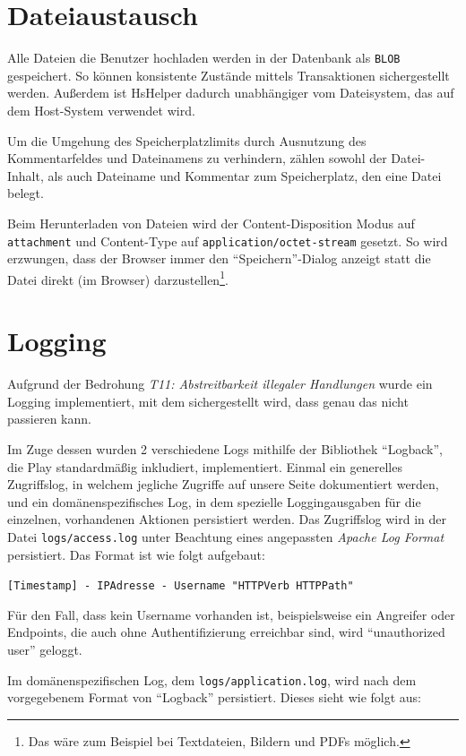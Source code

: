 \documentclass[12pt,DIV14,BCOR10mm,a4paper,parskip=half-,headsepline,headinclude,english,ngerman,bibliography=totocnumbered]{scrreprt}
\begin{document}
\section{Dateiaustausch}
Alle Dateien die Benutzer hochladen werden in der Datenbank als \texttt{BLOB} gespeichert. So können konsistente Zustände mittels Transaktionen sichergestellt werden. Außerdem ist HsHelper dadurch unabhängiger vom Dateisystem, das auf dem Host-System verwendet wird.

Um die Umgehung des Speicherplatzlimits durch Ausnutzung des Kommentarfeldes und Dateinamens zu verhindern, zählen sowohl der Datei-Inhalt, als auch Dateiname und Kommentar zum Speicherplatz, den eine Datei belegt.

Beim Herunterladen von Dateien wird der Content-Disposition Modus auf \texttt{attachment} und Content-Type auf \texttt{application/octet-stream} gesetzt. So wird erzwungen, dass der Browser immer den \enquote{Speichern}-Dialog anzeigt statt die Datei direkt (im Browser) darzustellen\footnote{Das wäre zum Beispiel bei Textdateien, Bildern und PDFs möglich.}.

\section{Logging}

Aufgrund der Bedrohung \textit{T11: Abstreitbarkeit illegaler Handlungen} wurde ein Logging implementiert, mit dem sichergestellt wird, dass genau das nicht passieren kann.

Im Zuge dessen wurden 2 verschiedene Logs mithilfe der Bibliothek \enquote{Logback}, die Play standardmäßig inkludiert, implementiert.
Einmal ein generelles Zugriffslog, in welchem jegliche Zugriffe auf unsere Seite dokumentiert werden, und ein domänenspezifisches Log, in dem spezielle Loggingausgaben für die einzelnen, vorhandenen Aktionen persistiert werden.
Das Zugriffslog wird in der Datei \texttt{logs/access.log} unter Beachtung eines angepassten \textit{Apache Log Format} persistiert.
Das Format ist wie folgt aufgebaut:

\texttt{[Timestamp] - IPAdresse - Username "HTTPVerb HTTPPath"}

Für den Fall, dass kein Username vorhanden ist, beispielsweise ein Angreifer oder Endpoints, die auch ohne Authentifizierung erreichbar sind, wird \enquote{unauthorized user} geloggt.

Im domänenspezifischen Log, dem \texttt{logs/application.log}, wird nach dem vorgegebenem Format von \enquote{Logback} persistiert.
Dieses sieht wie folgt aus:
\end{document}
